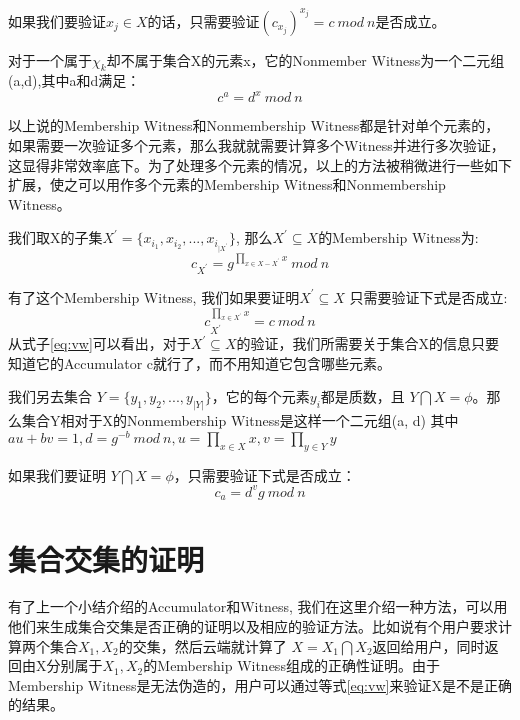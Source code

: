 如果我们要验证$x_j \in X$的话，只需要验证$(c_{x_j})^{x_j} = c\ mod\ n$是否成立。

对于一个属于$\chi_k$却不属于集合X的元素x，它的Nonmember Witness为一个二元组(a,d)\cite{li2007universal},其中a和d满足：
\begin{equation} c^a = d^x\ mod\ n\end{equation}

以上说的Membership Witness和Nonmembership Witness都是针对单个元素的，如果需要一次验证多个元素，那么我就就需要计算多个Witness并进行多次验证，这显得非常效率底下。为了处理多个元素的情况，以上的方法被稍微进行一些如下扩展，使之可以用作多个元素的Membership Witness和Nonmembership Witness。

我们取X的子集$X^{\prime} = \{x_{i_1}, x_{i_2}, ... , x_{i_{|X^\prime}}\}$, 那么$X^\prime \subseteq X$的Membership Witness为:
\begin{equation} \label{eq:w} c_{X^\prime} = g^{\prod_{x \in X - X^\prime} x}\ mod\ n \end{equation}

有了这个Membership Witness, 我们如果要证明$X^\prime \subseteq X$ 只需要验证下式是否成立:
\begin{equation} \label{eq:vw} c_{X^\prime}^{\prod_{x \in X^\prime} x} = c\ mod\ n\end{equation}
从式子\ref{eq:vw}可以看出，对于$X^\prime \subseteq X$的验证，我们所需要关于集合X的信息只要知道它的Accumulator c就行了，而不用知道它包含哪些元素。

我们另去集合 $Y = \{y_1, y_2, ... , y_{|Y|}\}$，它的每个元素$y_i$都是质数，且 $Y \bigcap X = \phi$。那么集合Y相对于X的Nonmembership Witness是这样一个二元组(a, d) 其中
$au + bv = 1, d = g^{-b}\ mod\ n, u = \prod_{x \in X} x, v = \prod_{y \in Y} y$

如果我们要证明 $Y \bigcap X = \phi$，只需要验证下式是否成立：
\begin{equation} \label{eq:vnw} c_a = d^v g\ mod\ n \end{equation}

\section{集合交集的证明}
有了上一个小结介绍的Accumulator和Witness, 我们在这里介绍一种方法，可以用他们来生成集合交集是否正确的证明以及相应的验证方法。比如说有个用户要求计算两个集合$X_1, X_2$的交集，然后云端就计算了 $X = X_1 \bigcap X_2$返回给用户，同时返回由X分别属于$X_1, X_2$的Membership Witness组成的正确性证明。由于Membership Witness是无法伪造的，用户可以通过等式\ref{eq:vw}来验证X是不是正确的结果。

